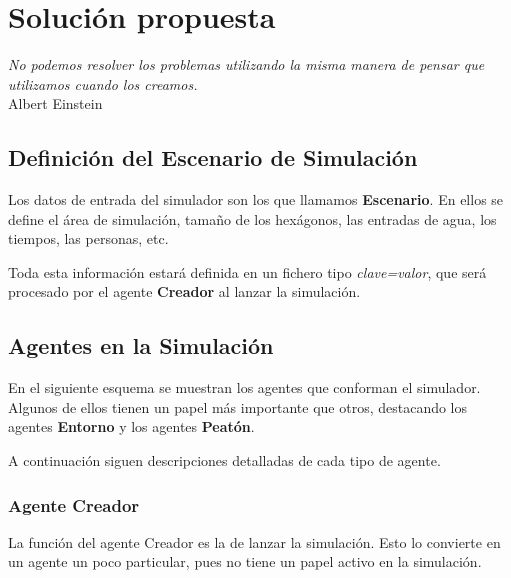 
\chapter*{Solución propuesta} \label{cap3}

\begin{flushright}
\begin{minipage}{7.85cm}
    {\em No podemos resolver los problemas utilizando la misma manera de pensar
    que utilizamos cuando los creamos.} \\ Albert Einstein
\end{minipage}
\end{flushright}

\vspace*{5mm}

\section*{Definición del Escenario de Simulación}

Los datos de entrada del simulador son los que llamamos {\bf Escenario}. En
ellos se define el área de simulación, tamaño de los hexágonos, las entradas de
agua, los tiempos, las personas, etc.

Toda esta información estará definida en un fichero tipo {\em clave=valor}, que
será procesado por el agente {\bf Creador} al lanzar la simulación.

\section*{Agentes en la Simulación}

En el siguiente esquema se muestran los agentes que conforman el simulador.
Algunos de ellos tienen un papel más importante que otros, destacando los
agentes {\bf Entorno} y los agentes {\bf Peatón}.


A continuación siguen descripciones detalladas de cada tipo de agente.

\subsection*{Agente Creador}

La función del agente Creador es la de lanzar la simulación. Esto lo convierte
en un agente un poco particular, pues no tiene un papel activo en la
simulación.

